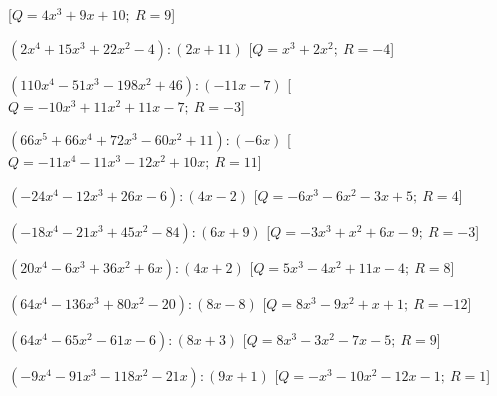\begin{esercizio}
\begin{enumeratea}
   \hfill [\(Q = 4 x^3 +9 x +10;~R = 9\)]
  \item  \(\left(2 x^4 +15 x^3 +22 x^2 -4 \right) : \left(2 x +11 \right)\)
   \hfill [\(Q = x^3 +2 x^2 ;~R = -4\)]
  \item  \(\left(110 x^4 -51 x^3 -198 x^2 +46 \right) : \left(-11 x -7 \right)\)
   \hfill [\(Q = -10 x^3 +11 x^2 +11 x -7;~R = -3\)]
  \item  \(\left(66 x^5 +66 x^4 +72 x^3 -60 x^2 +11 \right) : \left(-6 x  
\right)\)
   \hfill [\(Q = -11 x^4 -11 x^3 -12 x^2 +10 x ;~R = 11\)]
  \item  \(\left(-24 x^4 -12 x^3 +26 x -6 \right) : \left(4 x -2 \right)\)
   \hfill [\(Q = -6 x^3 -6 x^2 -3 x +5;~R = 4\)]
  \item  \(\left(-18 x^4 -21 x^3 +45 x^2 -84 \right) : \left(6 x +9 \right)\)
   \hfill [\(Q = -3 x^3 + x^2 +6 x -9;~R = -3\)]
  \item  \(\left(20 x^4 -6 x^3 +36 x^2 +6 x  \right) : \left(4 x +2 \right)\)
   \hfill [\(Q = 5 x^3 -4 x^2 +11 x -4;~R = 8\)]
  \item  \(\left(64 x^4 -136 x^3 +80 x^2 -20 \right) : \left(8 x -8 \right)\)
   \hfill [\(Q = 8 x^3 -9 x^2 + x +1;~R = -12\)]
  \item  \(\left(64 x^4 -65 x^2 -61 x -6 \right) : \left(8 x +3 \right)\)
   \hfill [\(Q = 8 x^3 -3 x^2 -7 x -5;~R = 9\)]
  \item  \(\left(-9 x^4 -91 x^3 -118 x^2 -21 x  \right) : \left(9 x +1 \right)\)
   \hfill [\(Q = - x^3 -10 x^2 -12 x -1;~R = 1\)]
 \end{enumeratea}
\end{esercizio}


